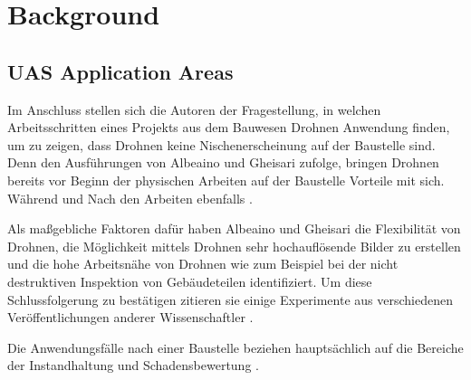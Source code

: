 
\section{Background}
\subsection{UAS Application Areas}
Im Anschluss stellen sich die Autoren der Fragestellung, in welchen Arbeitsschritten eines Projekts aus dem Bauwesen Drohnen Anwendung finden, um zu zeigen, dass Drohnen keine Nischenerscheinung auf der Baustelle sind.
Denn den Ausführungen von Albeaino und Gheisari zufolge, bringen Drohnen bereits vor Beginn der physischen Arbeiten auf der Baustelle Vorteile mit sich.
Während und Nach den Arbeiten ebenfalls \cite[S. 86]{abaeano2021trends}.

Als maßgebliche Faktoren dafür haben Albeaino und Gheisari die Flexibilität von Drohnen, die Möglichkeit mittels Drohnen sehr hochauflösende Bilder zu erstellen und die hohe Arbeitsnähe von Drohnen wie zum Beispiel bei der nicht destruktiven Inspektion von Gebäudeteilen identifiziert.
Um diese Schlussfolgerung zu bestätigen zitieren sie einige Experimente aus verschiedenen Veröffentlichungen anderer Wissenschaftler \cite[S. 87--88]{abaeano2021trends}.

Die Anwendungsfälle nach einer Baustelle beziehen hauptsächlich auf die Bereiche der Instandhaltung und Schadensbewertung \cite[S. 89]{abaeano2021trends}.



